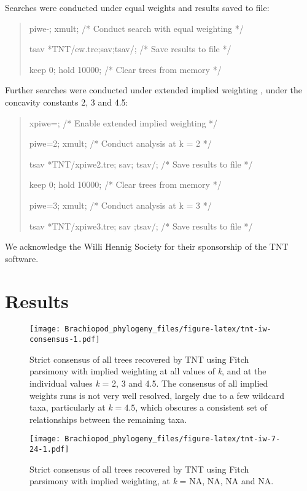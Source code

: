 \documentclass[openany]{book}
\theoremstyle{definition}
\theoremstyle{definition}
\theoremstyle{definition}
\theoremstyle{remark}
\begin{document}
Searches were conducted under equal weights and results saved to file:

\begin{quote}
piwe-; xmult; {/* Conduct search with equal weighting */}

tsav *TNT/ew.tre;sav;tsav/; {/* Save results to file */}

keep 0; hold 10000; {/* Clear trees from memory */}
\end{quote}

Further searches were conducted under extended implied weighting
\citep{Goloboff1997, Goloboff2014}, under the concavity constants 2, 3
and 4.5:

\begin{quote}
xpiwe=; {/* Enable extended implied weighting */}

piwe=2; xmult; {/* Conduct analysis at k = 2 */}

tsav *TNT/xpiwe2.tre; sav; tsav/; {/* Save results to file */}

keep 0; hold 10000; {/* Clear trees from memory */}

piwe=3; xmult; {/* Conduct analysis at k = 3 */}

tsav *TNT/xpiwe3.tre; sav ;tsav/; {/* Save results to file */}
\end{quote}

We acknowledge the Willi Hennig Society for their sponsorship of the TNT
software.

\section{Results}\label{results-1}









\begin{figure}
\centering
\texttt{[image: Brachiopod\_phylogeny\_files/figure-latex/tnt-iw-consensus-1.pdf]}
\caption{\label{fig:tnt-iw-consensus}Strict consensus of all trees recovered by TNT
using Fitch parsimony with implied weighting at all values of \emph{k}, and at the individual
values \emph{k} = 2, 3 and 4.5.
The consensus of all implied weights runs is
not very well resolved, largely due to a few wildcard taxa, particularly
at \(k = 4.5\), which obscures a consistent set of relationships between
the remaining taxa.}
\end{figure}

\begin{figure}
\centering
\texttt{[image: Brachiopod\_phylogeny\_files/figure-latex/tnt-iw-7-24-1.pdf]}
\caption{\label{fig:tnt-iw-7-24}Strict consensus of all trees recovered by TNT
using Fitch parsimony with implied weighting, at \emph{k} = NA, NA, NA and NA.}
\end{figure}
\end{document}
